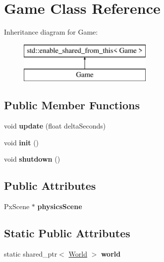 \hypertarget{class_game}{}\section{Game Class Reference}
\label{class_game}
Inheritance diagram for Game\+:\begin{figure}[H]
\begin{center}
\leavevmode
\includegraphics[height=2.000000cm]{class_game}
\end{center}
\end{figure}
\subsection*{Public Member Functions}
\begin{DoxyCompactItemize}
\item 
\hypertarget{class_game_ad63cb8a7a3091b9542186e4c1128a59b}{}void {\bfseries update} (float delta\+Seconds)\label{class_game_ad63cb8a7a3091b9542186e4c1128a59b}

\item 
\hypertarget{class_game_a6f3a33940524b6ba9d83f627ccb14bbf}{}void {\bfseries init} ()\label{class_game_a6f3a33940524b6ba9d83f627ccb14bbf}

\item 
\hypertarget{class_game_aee1b95e6fd0cb0f441c3b7cef73b1abe}{}void {\bfseries shutdown} ()\label{class_game_aee1b95e6fd0cb0f441c3b7cef73b1abe}

\end{DoxyCompactItemize}
\subsection*{Public Attributes}
\begin{DoxyCompactItemize}
\item 
\hypertarget{class_game_a550e03843cecc2678a6d42b3cc656d7b}{}Px\+Scene $\ast$ {\bfseries physics\+Scene}\label{class_game_a550e03843cecc2678a6d42b3cc656d7b}

\end{DoxyCompactItemize}
\subsection*{Static Public Attributes}
\begin{DoxyCompactItemize}
\item 
\hypertarget{class_game_aa4b3e2d2e9914ea12726c5f26ef7023a}{}static shared\+\_\+ptr$<$ \hyperlink{class_world}{World} $>$ {\bfseries world}\label{class_game_aa4b3e2d2e9914ea12726c5f26ef7023a}

\end{DoxyCompactItemize}



